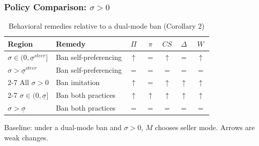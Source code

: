 \begin{frame}
  \frametitle{Policy Comparison: $\sigma>0$}
  \scriptsize

  \begin{table}
    \centering
    \caption{Behavioral remedies relative to a dual-mode ban (Corollary 2)}
    \label{tab:corollary2-positive-sigma}
    \begin{threeparttable}
    \begin{tabular}{@{}llccccc@{}}
      \toprule
      Region & Remedy & $\Pi$ & $\pi$ & $CS$ & $\Delta$ & $W$ \\
      \midrule
      $\sigma\in(0,\underline{\sigma}^{steer}]$
        & Ban self-preferencing & $\uparrow$ & $=$ & $\uparrow$ & $=$ & $\uparrow$ \\
      $\sigma>\underline{\sigma}^{steer}$
        & Ban self-preferencing & $=$ & $=$ & $=$ & $=$ & $=$ \\
      \cmidrule(lr){2-7}
      All $\sigma>0$
        & Ban imitation & $\uparrow$ & $=$ & $\uparrow$ & $\uparrow$ & $\uparrow$ \\
      \cmidrule(lr){2-7}
      $\sigma\in(0,\underline{\sigma}]$
        & Ban both practices & $\uparrow$ & $\uparrow$ & $\uparrow$ & $\uparrow$ & $\uparrow$ \\
      $\sigma>\underline{\sigma}$
        & Ban both practices & $=$ & $=$ & $=$ & $=$ & $=$ \\
      \bottomrule
    \end{tabular}
    \begin{tablenotes}
      \scriptsize
      \item Baseline: under a dual-mode ban and $\sigma>0$, $M$ chooses seller mode. Arrows are weak changes.
    \end{tablenotes}
    \end{threeparttable}
  \end{table}
\end{frame}

